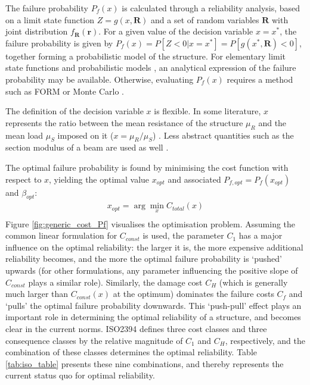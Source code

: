 The failure probability $P_f(x)$ is calculated through a reliability analysis, based on a limit state function $Z=g(x,\mathbf{R})$ and a set of random variables $\mathbf{R}$ with joint distribution $f_{\mathbf{R}}(\mathbf{r})$.
For a given value of the decision variable $x=x^*$, the failure probability is given by $P_f(x) = P[Z<0|x=x^*]=P[g(x^*,\mathbf{R})<0]$, together forming a probabilistic model of the structure.
For elementary limit state functions and probabilistic models \citep{Rackwitz2000OptimizationVerification}, an analytical expression of the failure probability may be available.
Otherwise, evaluating $P_f(x)$ requires a method such as FORM or Monte Carlo \citep{Ditlevsen2005StructuralMethods}.

The definition of the decision variable $x$ is flexible.
In some literature, $x$ represents the ratio between the mean resistance of the structure $\mu_R$ and the mean load $\mu_S$ imposed on it ($x=\mu_R/\mu_S$) \citep{Rackwitz2000OptimizationVerification, Viljoen2012DerivingLQI}.
Less abstract quantities such as the section modulus of a beam are used as well \citep{Hingorani2023TowardsDesign}.

The optimal failure probability is found by minimising the cost function with respect to $x$, yielding the optimal value $x_{opt}$ and associated $P_{f,opt} = P_f(x_{opt})$ and $\beta_{opt}$:
\begin{equation}
    \begin{aligned}
        x_{opt} = \arg \min_{x} C_{total}(x)\\
    \end{aligned}
\end{equation}
Figure \ref{fig:generic_cost_Pf} visualises the optimisation problem.
Assuming the common linear formulation for $C_{const}$ is used, the parameter $C_1$ has a major influence on the optimal reliability: the larger it is, the more expensive additional reliability becomes, and the more the optimal failure probability is `pushed' upwards (for other formulations, any parameter influencing the positive slope of $C_{const}$ plays a similar role).
Similarly, the damage cost $C_H$ (which is generally much larger than $C_{const}(x)$ at the optimum) dominates the failure costs $C_f$ and `pulls' the optimal failure probability downwards.
This `push-pull' effect plays an important role in determining the optimal reliability of a structure, and becomes clear in the current norms.
ISO2394 defines three cost classes and three consequence classes by the relative magnitude of $C_1$ and $C_H$, respectively, and the combination of these classes determines the optimal reliability.
Table \ref{tab:iso_table} presents these nine combinations, and thereby represents the current status quo for optimal reliability.



